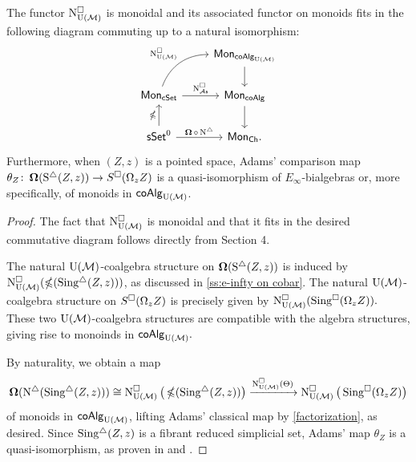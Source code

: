 \begin{nntheorem}
	The functor $\cchainsUM$ is monoidal and its associated functor on monoids fits in the following diagram commuting up to a natural isomorphism:
	\begin{equation*}
	\begin{tikzcd}
	& \Mon_{\coAlg_\UM} \arrow[d] \\
	\Mon_{\cSet} \arrow[ru, "\cchainsUM", out=70, in=180] \arrow[r, "\cchainsAS"]
	& \Mon_{\coAlg} \arrow[d] \\
	\sSet^0 \arrow[r, "\cobar \circ \schains"] \arrow[u, "\ccobar"]
	& \Mon_{\Ch}.
	\end{tikzcd}
	\end{equation*}
	Furthermore, when $(Z, z)$ is a pointed space, Adams' comparison map $\theta_Z \colon \cobar(\sS(Z, z)) \to S^{\cube}(\Omega_z Z)$ is a quasi-isomorphism of $E_{\infty}$-bialgebras or, more specifically, of monoids in $\coAlg_\UM$.
\end{nntheorem} 

\begin{proof}
	The fact that $\cchainsUM$ is monoidal and that it fits in the desired commutative diagram follows directly from Section 4.
	    
	The natural $\UM$-coalgebra structure on $\cobar(\sS(Z, z))$ is induced by $\cchainsUM ( \ccobar (\sSing(Z, z)) )$, as discussed in \cref{ss:e-infty on cobar}.
	The natural $\UM$-coalgebra structure on $S^{\cube}(\Omega_z Z)$ is precisely given by $\cchainsUM( \cSing(\Omega_z Z) ).$ These two $\UM$-coalgebra structures are compatible with the algebra structures, giving rise to monoinds in $\coAlg_{\UM}.$
	     
	By naturality, we obtain a map
	\begin{equation*}
	\cobar(\schains(\sSing(Z, z))) \cong
	\cchainsUM \big( \ccobar(\sSing(Z, z)) \big) \xra{\cchainsUM(\Theta)}
	\cchainsUM \big( \cSing(\Omega_z Z) \big)
	\end{equation*}
	of monoids in $\coAlg_{\UM}$, lifting Adams' classical map by \cref{factorization}, as desired.
	Since $\sSing(Z, z)$ is a fibrant reduced simplicial set, Adams' map $\theta_Z$ is a quasi-isomorphism, as proven in \cite{rivera2018cubical} and \cite{rivera2019path}. 
\end{proof}